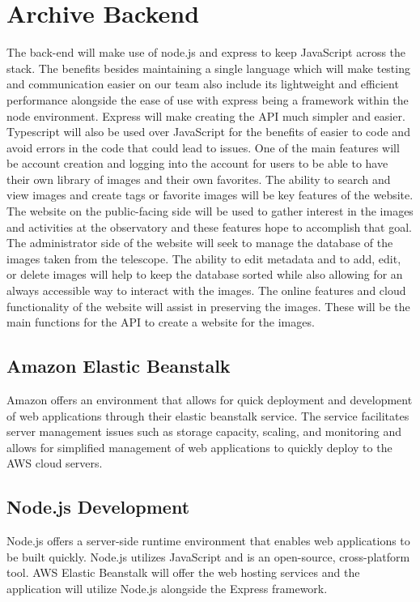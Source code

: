 \documentclass[12pt]{report}
\begin{document}
\section*{Archive Backend}

The back-end will make use of node.js and express to keep JavaScript across the stack.  The benefits besides maintaining a single language which will make testing and communication easier on our team also include its lightweight and efficient performance alongside the ease of use with express being a framework within the node environment.  Express will make creating the API much simpler and easier.  Typescript will also be used over JavaScript for the benefits of easier to code and avoid errors in the code that could lead to issues.
One of the main features will be account creation and logging into the account for users to be able to have their own library of images and their own favorites.  The ability to search and view images and create tags or favorite images will be key features of the website.  The website on the public-facing side will be used to gather interest in the images and activities at the observatory and these features hope to accomplish that goal.
The administrator side of the website will seek to manage the database of the images taken from the telescope.  The ability to edit metadata and to add, edit, or delete images will help to keep the database sorted while also allowing for an always accessible way to interact with the images.  The online features and cloud functionality of the website will assist in preserving the images.  These will be the main functions for the API to create a website for the images.


\subsection{Amazon Elastic Beanstalk}

Amazon offers an environment that allows for quick deployment and development of web applications through their elastic beanstalk service.  The service facilitates server management issues such as storage capacity, scaling, and monitoring and allows for simplified management of web applications to quickly deploy to the AWS cloud servers.

\subsection{Node.js Development}

Node.js offers a server-side runtime environment that enables web applications to be built quickly.  Node.js utilizes JavaScript and is an open-source, cross-platform tool.  AWS Elastic Beanstalk will offer the web hosting services and the application will utilize Node.js alongside the Express framework.
\end{document}
